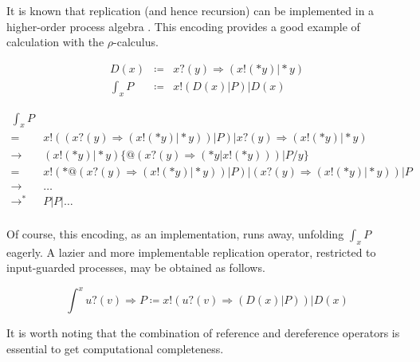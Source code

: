 \documentclass[]{amsart}
\makeatletter
\newcommand{\lpquote}{\ulcorner}
\newcommand{\rpquote}{\urcorner}
\newcommand{\id}[1]{\texttt{#1}}
\newcommand{\juxtap}{\mathbin{\id{|}}}
\newcommand{\concat}{\Rightarrow}
\newcommand{\binpar}[2]{#1 \juxtap #2}
\newcommand{\outputp}[2]{#1 ! ( * #2 )}
\newcommand{\prefix}[3]{#1 ? ( #2 ) \concat #3}
\newcommand{\lift}[2]{#1 ! ( #2 )}
\newcommand{\quotep}[1]{@#1}
\newcommand{\dropn}[1]{*#1}
\newcommand{\xbangp}[2]{\int_{#2} #1}
\newcommand{\bangxp}[2]{\int^{#2} #1}
\newcommand{\substn}[2]{\id{\{} #1 / #2 \id{\}}}
\newcommand{\defneqls}{\coloneqq}
\newcommand{\red}{\rightarrow}
\theoremstyle{definition}
\theoremstyle{remark}
\numberwithin{equation}{subsection}
\newcommand{\rhoc}{$\rho$-calculus}
\makeatother
\begin{document}
It is known that replication (and hence recursion) can be implemented
in a higher-order process algebra \cite{SangiorgiWalker}. This
encoding provides a good example of calculation with the {\rhoc}.


\begin{eqnarray*}
	D(x) & \defneqls & \prefix{x}{y}{(\binpar{\outputp{x}{y}}{\dropn{y}})} \\
	\xbangp{P}{x} & \defneqls & \binpar{\lift{x}{\binpar{D(x)}{P}}}{D(x)}
\end{eqnarray*}

\begin{eqnarray*}
	\xbangp{P}{x} & & \\
	=
	& \lift{x}{(\prefix{x}{y}{(\outputp{x}{y} \juxtap \dropn{y})) \juxtap P}} 
	      \juxtap \prefix{x}{y}{(\outputp{x}{y} \juxtap \dropn{y})} & \\
	\red
	& (\outputp{x}{y} \juxtap \dropn{y})\substn{\quotep{(\prefix{x}{y}{(\dropn{y} \juxtap \outputp{x}{y})) \juxtap P}}}{y} & \\
	=
	& \outputp{x}{\quotep{(\prefix{x}{y}{(\outputp{x}{y} \juxtap \dropn{y})) \juxtap P}}}
	  \juxtap {(\prefix{x}{y}{(\outputp{x}{y} \juxtap \dropn{y})) \juxtap P}} & \\
	\red
	& \ldots & \\
	\red^*
	& P \juxtap P \juxtap \ldots & \\
\end{eqnarray*}

Of course, this encoding, as an implementation, runs away, unfolding
$\xbangp{P}{x}$ eagerly. A lazier and more implementable replication
operator, restricted to input-guarded processes, may be obtained as follows.

\begin{equation*}
\bangxp{\prefix{u}{v}{P}}{x}
	\defneqls 
	\binpar{\lift{x}{\prefix{u}{v}{(\binpar{D(x)}{P})}}}{D(x)}
\end{equation*}

It is worth noting that the combination of reference and dereference
operators is essential to get computational completeness. 
\end{document}
